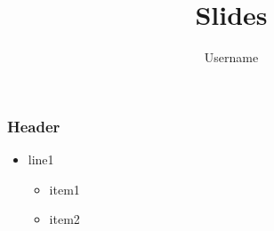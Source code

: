 \documentclass[14pt,t]{beamer}
\title{Slides}
\author{Username}
\begin{document}
\maketitle
\begin{frame}
\frametitle{Header}
\begin{itemize}
\item line1
\begin{itemize}
\item item1
\item item2
\end{itemize}
\end{itemize}
\end{frame}
\end{document}
